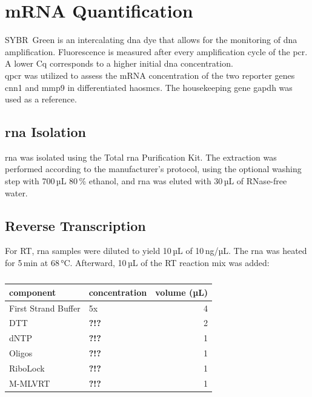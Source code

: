 \section{mRNA Quantification}
\label{sec:qpcr}
SYBR\textregistered~Green is an intercalating \ac{dna} dye that allows for the monitoring of \ac{dna} amplification. Fluorescence is measured after every amplification cycle of the \ac{pcr}. A lower \ac{Cq} corresponds to a higher initial \ac{dna} concentration. \cite{huggettStandardisationReportingNucleic2011}\\
\Ac{qpcr} was utilized to assess the \ac{mRNA} concentration of the two reporter genes \ac{cnn1} and \ac{mmp9} in differentiated \acp{haosmc}. The housekeeping gene \ac{gapdh} was used as a reference.


    \subsection{\ac{rna} Isolation}
    \ac{rna} was isolated using the Total \ac{rna} Purification Kit. The extraction was performed according to the manufacturer's protocol, using the optional washing step with 700\,µL 80\,\% ethanol, and \ac{rna} was eluted with 30\,µL of RNase-free water.

    \subsection{Reverse Transcription}
    For \ac{RT}, \ac{rna} samples were diluted to yield 10\,µL of 10\,ng/µL. The \ac{rna} was heated for 5\,min at 68\,°C. Afterward, 10\,µL of the \ac{RT} reaction mix was added:

    \begin{table}[h]
    \capstart
	\centering
	\begin{minipage}{\captionwidth}
	   	\caption[RT mastermix]{}
	   	\label{tab:RT Mastr Mix}
	\end{minipage}
    \begin{tabular}{|l|l|r|}
        \hline
        component               & concentration & volume (µL) \\ \hline
        First Strand Buffer     & 5x            & 4           \\
        \acs{DTT}               &\textbf{\color{red} ?!?}               & 2           \\
        \acs{dNTP}              &\textbf{\color{red} ?!?}               & 1           \\
        Oligos                  &\textbf{\color{red} ?!?}               & 1           \\
        RiboLock                &\textbf{\color{red} ?!?}               & 1           \\
        M-MLVRT                 &\textbf{\color{red} ?!?}               & 1           \\ \hline
    \end{tabular}
    \end{table}

